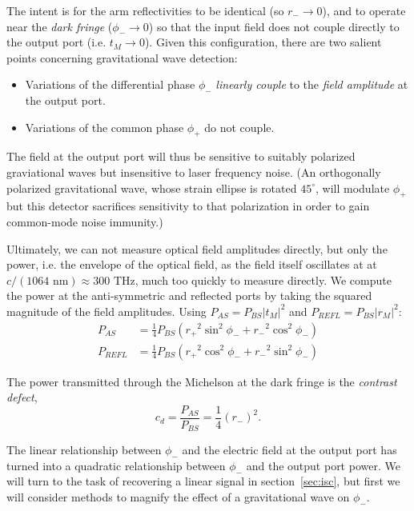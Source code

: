 The intent is for the arm reflectivities to be identical (so $r_- \to
0$), and to operate near the \emph{dark fringe} ($\phi_-\to0$) so that
the input field does not couple directly to the output port
(i.e. $t_M\to0$).  Given this configuration, there are two salient
points concerning gravitational wave detection:
%
\begin{itemize}
\item Variations of the differential phase $\phi_-$ \emph{linearly couple} to the \emph{field amplitude} at the output port.
\item Variations of the common phase $\phi_+$ do not couple.
\end{itemize}
%
The field at the output port will thus be sensitive to suitably
polarized graviational waves but insensitive to laser frequency noise.
(An orthogonally polarized gravitational wave, whose strain ellipse is
rotated $45^\circ$, will modulate $\phi_+$ but this detector
sacrifices sensitivity to that polarization in order to gain
common-mode noise immunity.)  

Ultimately, we can not measure optical field amplitudes directly, but
only the power, i.e. the envelope of the optical field, as the field
itself oscillates at at $c/(1064\text{ nm})\approx 300\text{ THz}$,
much too quickly to measure directly.  We compute the power at the
anti-symmetric and reflected ports by taking the squared magnitude of
the field amplitudes.  Using $P_{AS} = P_{BS} \left|t_M\right|^2$ and
$P_{REFL} = P_{BS} \left|r_M\right|^2$:
%
\begin{align}
P_{AS}   &=  \frac{1}{4}P_{BS}\left( {r_+}^2 \sin^2 \phi_- + {r_-}^2 \cos^2 \phi_-\right) \\
P_{REFL} &=  \frac{1}{4}P_{BS}\left( {r_+}^2 \cos^2 \phi_- + {r_-}^2 \sin^2 \phi_-\right) 
\end{align}

The power transmitted through the Michelson at the dark fringe is the
\emph{contrast defect},
%
\begin{equation}
c_d = \frac{P_{AS}}{P_{BS}} = \frac{1}{4}\left(r_-\right)^2.
\end{equation}

The linear relationship between $\phi_-$ and the electric field at the
output port has turned into a quadratic relationship between $\phi_-$
and the output port power.  We will turn to the task of recovering a
linear signal in section~\ref{sec:isc}, but first we will consider
methods to magnify the effect of a gravitational wave on $\phi_-$.

